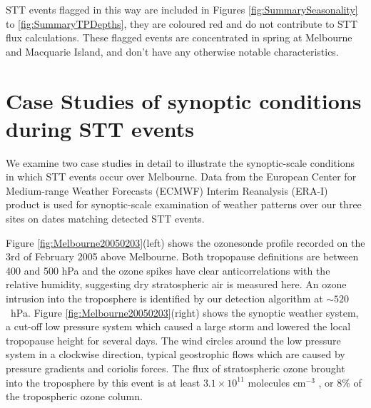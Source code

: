 \documentclass{article}
\begin{document}
    STT events flagged in this way are included in Figures \ref{fig:SummarySeasonality} to \ref{fig:SummaryTPDepths}, they are coloured red and do not contribute to STT flux calculations. 
    These flagged events are concentrated in spring at Melbourne and Macquarie Island, and don't have any otherwise notable characteristics.

\section{Case Studies of synoptic conditions during STT events}

  We examine two case studies in detail to illustrate the synoptic-scale conditions in which STT events occur over Melbourne.
  Data from the European Center for Medium-range Weather Forecasts (ECMWF) Interim Reanalysis (ERA-I) \citep{Dee2011} product is used for synoptic-scale examination of weather patterns over our three sites on dates matching detected STT events.
  
  Figure \ref{fig:Melbourne20050203}(left) shows the ozonesonde profile recorded on the 3rd of February 2005 above Melbourne.
  Both tropopause definitions are between 400 and 500 hPa and the ozone spikes have clear anticorrelations with the relative humidity, suggesting dry stratospheric air is measured here. 
  An ozone intrusion into the troposphere is identified by our detection algorithm at $\sim520$~hPa.
  Figure \ref{fig:Melbourne20050203}(right) shows the synoptic weather system, a cut-off low pressure system which caused a large storm and lowered the local tropopause height for several days.
  The wind circles around the low pressure system in a clockwise direction, typical geostrophic flows which are caused by pressure gradients and coriolis forces.
  The flux of stratospheric ozone brought into the troposphere by this event is at least $3.1 \times 10^{11}$ molecules cm$^{-3}$ , or 8\% of the tropospheric ozone column.
\end{document}
